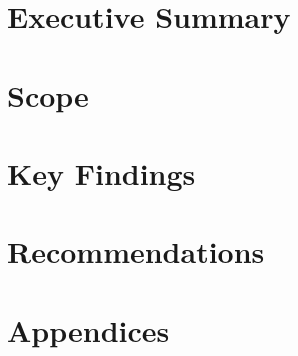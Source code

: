 \section{Executive Summary}
\lipsum[1]

\section{Scope}
\lipsum[2]

\section{Key Findings}
\lipsum[3]

\section{Recommendations}
\lipsum[4]

\section{Appendices}
\lipsum[5]
